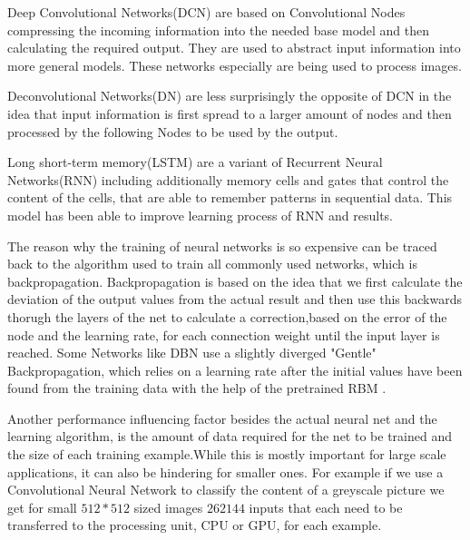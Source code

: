 \documentclass[conference]{IEEEtran}
\begin{document}
Deep Convolutional Networks(DCN) are based on Convolutional Nodes compressing the incoming information into the needed base model and then calculating the required output.\cite{PattersonGibson17} They are used to abstract input information into more general models. These networks especially are being used to process images.

Deconvolutional Networks(DN)\cite{zeiler2014visualizing} are less surprisingly the opposite of DCN in the idea that input information is first spread to a larger amount of nodes and then processed by the following Nodes to be used by the output.

Long short-term memory(LSTM)\cite{hochreiter1997long} are a variant of Recurrent Neural Networks(RNN) including additionally memory cells and gates that control the content of the cells, that are able to remember patterns in sequential data. This model has been able to improve learning process of RNN and results.


The reason why the training of neural networks is so expensive can be traced back to the algorithm used to train all commonly used networks, which is backpropagation. Backpropagation is based on the idea that we first calculate the deviation of the output values from the actual result and then use this backwards thorugh the layers of the net to calculate a correction,based on the error of the node and the learning rate, for each connection weight until the input layer is reached\cite{riedmiller1993direct}. Some Networks like DBN use a slightly 
diverged "Gentle" Backpropagation, which relies on a learning rate after the initial values have been found from the training data with the help of the pretrained RBM \cite{PattersonGibson17}.


Another performance influencing factor besides the actual neural net and the learning algorithm, is the amount of data required for the net to be trained and the size of each training example.While this is mostly important for large scale applications, it can also be hindering for smaller ones. For example if we use a Convolutional Neural Network to classify the content of a greyscale picture we get for small $512*512$ sized images $262144$ inputs that each need to be transferred to the processing unit, CPU or GPU, for each example.
\end{document}
